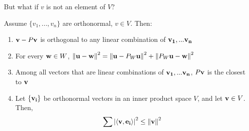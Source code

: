 But what if $v$ is not an element of $V$?
\begin{lemma}
    Assume $\{ v_1,...,v_n \}$ are orthonormal, $v \in V$. Then:
    \begin{enumerate}
        \item $\vb{v} - P\vb{v}$ is orthogonal to any linear combination of $\vb{v_1}, ... \vb{v_n}$
        \item For every $\vb{w} \in W$, $\norm{\vb{u} - \vb{w}}^2 = \norm{\vb{u} - P_W\vb{u}}^2 + \norm{P_W \vb{u} - \vb{w}}^2$
        \item Among all vectors that are linear combinations of $\vb{v_1}, ... \vb{v_n}$, $P\vb{v}$ is the closest to $\vb{v}$ 
        \item Let $\{ \vb{v_i} \}$ be orthonormal vectors in an inner product space $V$, and let $\vb{v} \in V$. Then,
        \begin{align}
            \sum \abs{\langle \vb{v}, \vb{e_i} \rangle}^2 \le \norm{\vb{v}}^2
        \end{align}
    \end{enumerate}
\end{lemma}
